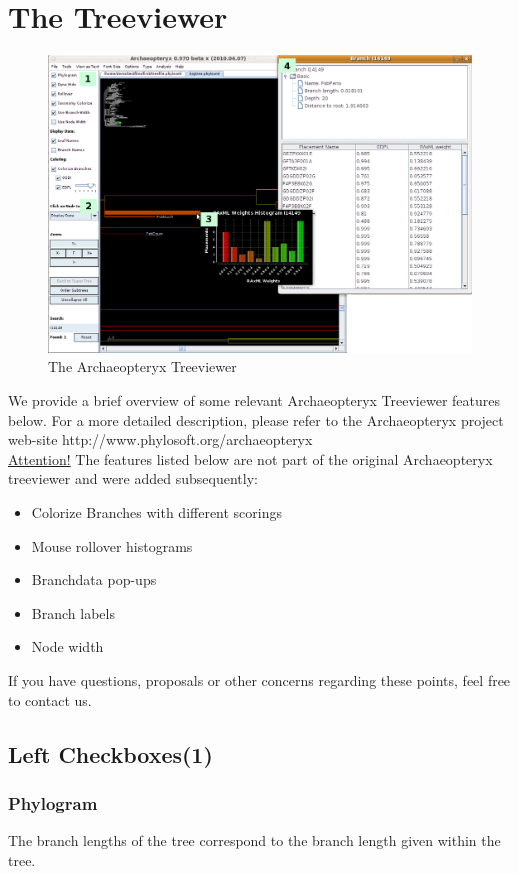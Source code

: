 \documentclass{article}
\begin{document}
\section{The Treeviewer}
	\begin{figure}[htb]
		\centering
		\includegraphics[scale=0.3]{./overview_treeviewer}
		\caption{The Archaeopteryx Treeviewer}
		\label{fig3}
		\end{figure}
    \noindent We provide a brief overview of some relevant Archaeopteryx Treeviewer features below.
	For a more detailed description, please refer to the Archaeopteryx project web-site http://www.phylosoft.org/archaeopteryx\\
    \underline{Attention!} The features listed below are not part of the original Archaeopteryx treeviewer and were added subsequently:
    \begin{itemize}
        \item Colorize Branches with different scorings
        \item Mouse rollover histograms
        \item Branchdata pop-ups
        \item Branch labels
        \item Node width
     \end{itemize}
      If you have questions, proposals or other concerns regarding these points, feel free to contact us. 
    	
   
        \subsection{Left Checkboxes(1)}
        \subsubsection*{Phylogram} The  branch lengths of the tree correspond to the branch length given within the tree.
\end{document}
